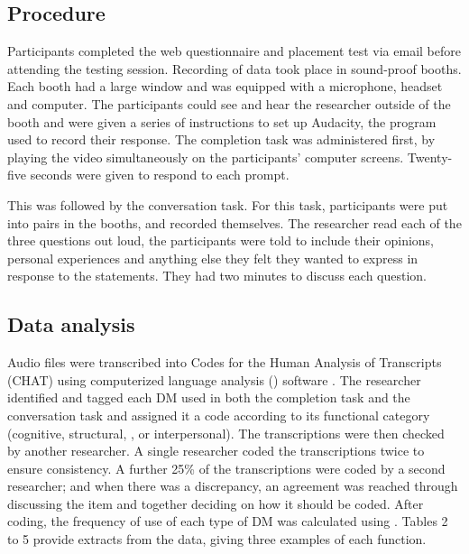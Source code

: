 \documentclass[output=paper]{langsci/langscibook}
\begin{document}
\subsection{Procedure}


Participants completed the web questionnaire and placement test via email before attending the testing session. Recording of data took place in sound-proof booths.  Each booth had a large window and was equipped with a microphone, headset and computer. The participants could see and hear the researcher outside of the booth and were given a series of instructions to set up Audacity, the program used to record their response. The  completion task was administered first, by playing the video simultaneously on the participants’ computer screens. Twenty-five seconds were given to respond to each prompt. 

This was followed by the conversation task. For this task, participants were put into pairs in the booths, and recorded themselves. The researcher read each of the three questions out loud, the participants were told to include their opinions, personal experiences and anything else they felt they wanted to express in response to the statements. They had two minutes to discuss each question.



\subsection{Data analysis}


Audio files were transcribed into Codes for the Human Analysis of Transcripts (CHAT) using computerized language analysis () software \citep{MacWhinney2000}. The researcher identified and tagged each DM used in both the  completion task and the conversation task and assigned it a code according to its functional category (cognitive, structural, , or interpersonal). The transcriptions were then checked by another researcher. A single researcher coded the transcriptions twice to ensure consistency. A further 25\% of the transcriptions were coded by a second researcher; and when there was a discrepancy, an agreement was reached through discussing the item and together deciding on how it should be coded. After coding, the frequency of use of each type of DM was calculated using .  Tables 2 to 5 provide extracts from the data, giving three examples of each function. 
\end{document}
